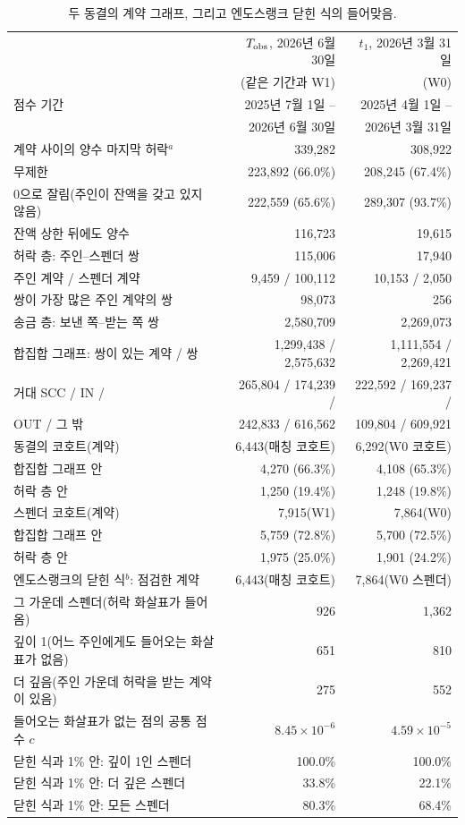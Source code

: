 \begin{table}[!htbp]
\centering
\caption{두 동결의 계약 그래프, 그리고 엔도스랭크 닫힌 식의 들어맞음.}
\label{tab1}
\footnotesize
\begin{tabular}{@{}L{6.4cm}rr@{}}
\toprule
 & $T_{\mathrm{obs}}$, 2026년 6월 30일 & $t_1$, 2026년 3월 31일 \\
 & (같은 기간과 W1) & (W0) \\
\midrule
점수 기간 & 2025년 7월 1일 – & 2025년 4월 1일 – \\
 & 2026년 6월 30일 & 2026년 3월 31일 \\
계약 사이의 양수 마지막 허락$^{a}$ & 339,282 & 308,922 \\
\quad 무제한 & 223,892 (66.0\%) & 208,245 (67.4\%) \\
\quad 0으로 잘림(주인이 잔액을 갖고 있지 않음) & 222,559 (65.6\%) & 289,307 (93.7\%) \\
\quad 잔액 상한 뒤에도 양수 & 116,723 & 19,615 \\
허락 층: 주인–스펜더 쌍 & 115,006 & 17,940 \\
\quad 주인 계약 / 스펜더 계약 & 9,459 / 100,112 & 10,153 / 2,050 \\
\quad 쌍이 가장 많은 주인 계약의 쌍 & 98,073 & 256 \\
송금 층: 보낸 쪽–받는 쪽 쌍 & 2,580,709 & 2,269,073 \\
합집합 그래프: 쌍이 있는 계약 / 쌍 & 1,299,438 / 2,575,632 & 1,111,554 / 2,269,421 \\
\quad 거대 SCC / IN / & 265,804 / 174,239 / & 222,592 / 169,237 / \\
\quad\quad OUT / 그 밖 & 242,833 / 616,562 & 109,804 / 609,921 \\
\midrule
동결의 코호트(계약) & 6,443(매칭 코호트) & 6,292(W0 코호트) \\
\quad 합집합 그래프 안 & 4,270 (66.3\%) & 4,108 (65.3\%) \\
\quad 허락 층 안 & 1,250 (19.4\%) & 1,248 (19.8\%) \\
스펜더 코호트(계약) & 7,915(W1) & 7,864(W0) \\
\quad 합집합 그래프 안 & 5,759 (72.8\%) & 5,700 (72.5\%) \\
\quad 허락 층 안 & 1,975 (25.0\%) & 1,901 (24.2\%) \\
\midrule
엔도스랭크의 닫힌 식$^{b}$: 점검한 계약 & 6,443(매칭 코호트) & 7,864(W0 스펜더) \\
\quad 그 가운데 스펜더(허락 화살표가 들어옴) & 926 & 1,362 \\
\quad 깊이 1(어느 주인에게도 들어오는 화살표가 없음) & 651 & 810 \\
\quad 더 깊음(주인 가운데 허락을 받는 계약이 있음) & 275 & 552 \\
\quad 들어오는 화살표가 없는 점의 공통 점수 $c$ & $8.45\times10^{-6}$ & $4.59\times10^{-5}$ \\
\quad 닫힌 식과 1\% 안: 깊이 1인 스펜더 & 100.0\% & 100.0\% \\
\quad 닫힌 식과 1\% 안: 더 깊은 스펜더 & 33.8\% & 22.1\% \\
\quad 닫힌 식과 1\% 안: 모든 스펜더 & 80.3\% & 68.4\% \\
\bottomrule
\end{tabular}


\end{table}
